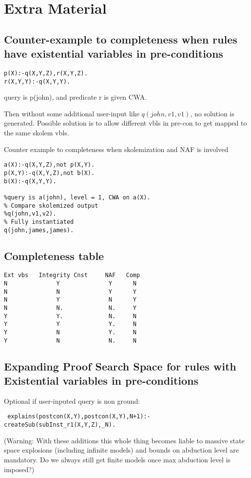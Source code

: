 \section{Extra Material}
\subsection{Counter-example to completeness when rules have existential variables in pre-conditions}
\begin{verbatim}
p(X):-q(X,Y,Z),r(X,Y,Z).
r(X,Y,Y):-q(X,Y,Y).
\end{verbatim}
query is p(john), and predicate r is given CWA. 

Then without some additional user-input like $q(john, v1,v1)$, no solution is generated. Possible solution is to allow different vbls in pre-con to get mapped to the same skolem vbls.

Counter example to completeness when skolemization and NAF is involved
\begin{verbatim}
a(X):-q(X,Y,Z),not p(X,Y).
p(X,Y):-q(X,Y,Z),not b(X).
b(X):-q(X,Y,Y).

%query is a(john), level = 1, CWA on a(X).
% Compare skolemized output
%q(john,v1,v2).
% Fully instantiated
q(john,james,james).    
\end{verbatim}

\subsection{Completeness table}
\begin{verbatim}
Ext vbs   Integrity Cnst     NAF   Comp
N              Y              Y      N
N              N              Y      Y
N              Y              N      Y
N              N.             N.     Y  
Y              Y.             N.     N 
Y              Y              Y.     N
Y              N              Y.     N 
Y              N              N.     N 
\end{verbatim}


\subsection{Expanding Proof Search Space for rules with Existential variables in pre-conditions}

Optional if user-inputed query is non ground:
\begin{verbatim}
 explains(postcon(X,Y),postcon(X,Y),N+1):-createSub(subInst_r1(X,Y,Z),_N).   
\end{verbatim}
(Warning: With these additions this whole thing becomes liable to massive state space explosions (including infinite models) and bounds on abduction level are mandatory. Do we always still get finite models once max abduction level is imposed?)

